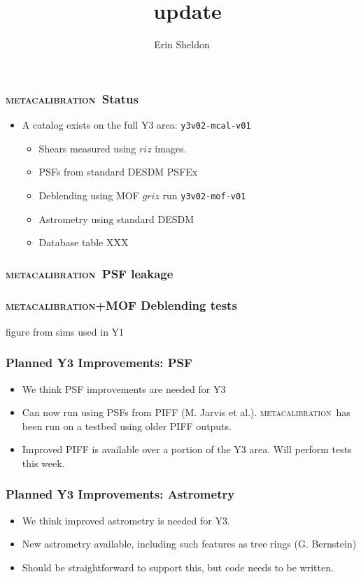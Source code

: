\documentclass{beamer}
\title{\mcal\ update}
\author{Erin Sheldon}
\institute{Brookhaven National Laboratory}
\newcommand{\mcal}{\textsc{metacalibration}}
\begin{document}
\frame{\titlepage}




\frame
{
    \frametitle{\mcal\ Status}

    \begin{itemize}

        \item A catalog exists on the full Y3 area: 
            {\color{gold} \texttt{y3v02-mcal-v01}}
            \begin{itemize}
                \item Shears measured using $riz$ images.
                \item PSFs from standard DESDM PSFEx 
                \item Deblending using MOF $griz$ run
                    {\color{gold} \texttt{y3v02-mof-v01}}
                \item Astrometry using standard DESDM
                \item Database table XXX
            \end{itemize}

    \end{itemize}

}

\frame
{
    \frametitle{\mcal\ PSF leakage}

}

\frame
{
    \frametitle{\mcal+MOF Deblending tests}

    figure from sims used in Y1
}




\frame
{
    \frametitle{Planned Y3 Improvements: PSF}

    \begin{itemize}

        \item We think PSF improvements are needed for Y3
        \item Can now run using PSFs from PIFF (M. Jarvis et al.).  \mcal\
            has been run on a testbed using older PIFF outputs.
        \item Improved PIFF is available over a portion of the Y3 area.
            Will perform tests this week.

    \end{itemize}

}

\frame
{
    \frametitle{Planned Y3 Improvements: Astrometry}

    \begin{itemize}

        \item We think improved astrometry is needed for Y3.
        \item New astrometry available, including such
            features as tree rings (G. Bernstein)
        \item Should be straightforward to support this,
            but code needs to be written.


    \end{itemize}

}
\end{document}
